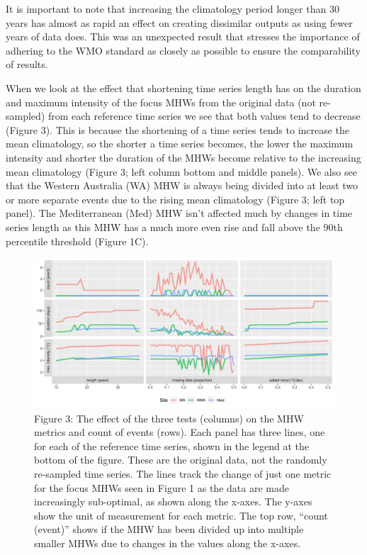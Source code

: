 \documentclass[]{article}
\begin{document}
It is important to note that increasing the climatology period longer
than 30 years has almost as rapid an effect on creating dissimilar
outputs as using fewer years of data does. This was an unexpected result
that stresses the importance of adhering to the WMO standard as closely
as possible to ensure the comparability of results.

When we look at the effect that shortening time series length has on the
duration and maximum intensity of the focus MHWs from the original data
(not re-sampled) from each reference time series we see that both values
tend to decrease (Figure 3). This is because the shortening of a time
series tends to increase the mean climatology, so the shorter a time
series becomes, the lower the maximum intensity and shorter the duration
of the MHWs become relative to the increasing mean climatology (Figure
3; left column bottom and middle panels). We also see that the Western
Australia (WA) MHW is always being divided into at least two or more
separate events due to the rising mean climatology (Figure 3; left top
panel). The Mediterranean (Med) MHW isn't affected much by changes in
time series length as this MHW has a much more even rise and fall above
the 90th percentile threshold (Figure 1C).

\begin{figure}
\centering
\includegraphics{../LaTeX/fig_3.png}
\caption{Figure 3: The effect of the three tests (columns) on the MHW
metrics and count of events (rows). Each panel has three lines, one for
each of the reference time series, shown in the legend at the bottom of
the figure. These are the original data, not the randomly re-sampled
time series. The lines track the change of just one metric for the focus
MHWs seen in Figure 1 as the data are made increasingly sub-optimal, as
shown along the x-axes. The y-axes show the unit of measurement for each
metric. The top row, ``count (event)'' shows if the MHW has been divided
up into multiple smaller MHWs due to changes in the values along the
x-axes.}
\end{figure}
\end{document}
